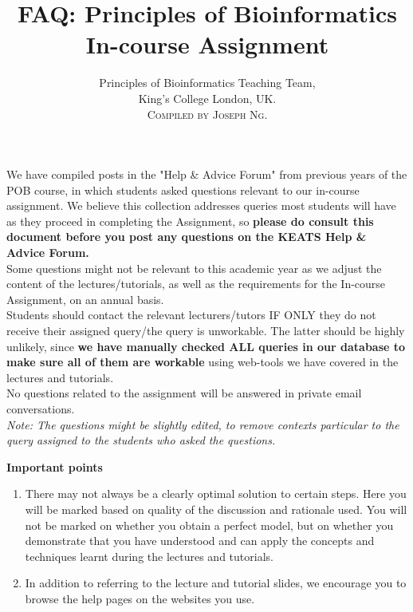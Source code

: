 \documentclass[10pt,a4paper]{article}
\begin{document}
\title{FAQ: Principles of Bioinformatics \\ In-course Assignment}
\author{Principles of Bioinformatics Teaching Team, \\ King's College London, UK. \\  \textsc{Compiled by Joseph Ng.}}
\maketitle

We have compiled posts in the "Help \& Advice Forum" from previous years of the POB course, in which students asked questions relevant to our in-course assignment. We believe this collection addresses queries most students will have as they proceed in completing the Assignment, so \textbf{please do consult this document before you post any questions on the KEATS Help \& Advice Forum.}\\

Some questions might not be relevant to this academic year as we adjust the content of the lectures/tutorials, as well as the requirements for the In-course Assignment, on an annual basis. \\

Students should contact the relevant lecturers/tutors IF ONLY they do not receive their assigned query/the query is unworkable. The latter should be highly unlikely, since \textbf{we have manually checked ALL queries in our database to make sure all of them are workable} using web-tools we have covered in the lectures and tutorials. \\

No questions related to the assignment will be answered in private email conversations.\\

\textit{Note: The questions might be slightly edited, to remove contexts particular to the query assigned to the students who asked the questions.} \newline

\textbf{Important points}
\begin{enumerate}
  \item There may not always be a clearly optimal solution to certain steps. Here you will be marked based on quality of the discussion and rationale used. You will not be marked on whether you obtain a perfect model, but on whether you demonstrate that you have understood and can apply the concepts and techniques learnt during the lectures and tutorials.
  \item In addition to referring to the lecture and tutorial slides, we encourage you to browse the help pages on the websites you use.
\end{enumerate}
\newpage
\end{document}
